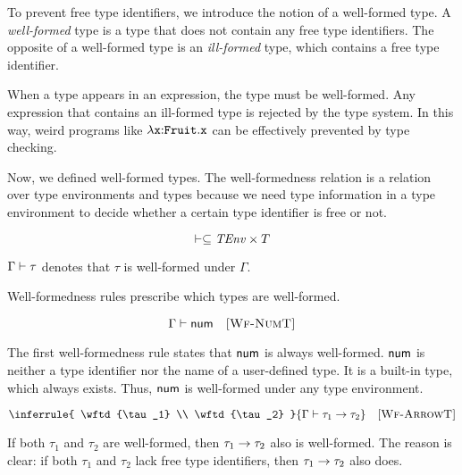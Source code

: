 To prevent free type identifiers, we introduce the notion of a well-formed type.
A \textit{well-formed} type is a type that does not contain
any free type identifiers. The opposite of a well-formed type is an
\textit{ill-formed} type, which contains a free type identifier.

When a type appears in an expression, the type must be well-formed. Any
expression that contains an ill-formed type is rejected by the type system.
In this way, weird programs like $\lambda\texttt{x}{:}\texttt{Fruit}.\texttt{x}$ can be
effectively prevented by type checking.

Now, we defined well-formed types. The well-formedness relation is a relation
over type environments and types because we need type information in a type
environment to decide whether a certain type identifier is free or not.

\[\vdash\subseteq\mbox{\emph{TEnv}}\times T\]

$\Gamma\vdash\tau$ denotes that $\tau$ is well-formed under $\Gamma$.

Well-formedness rules prescribe which types are well-formed.


\vspace{-1em}

\[
  \Gamma\vdash\textsf{num}
  \quad\textsc{[Wf-NumT]}
\]

The first well-formedness rule states that $\textsf{num}$ is always well-formed.
$\textsf{num}$ is neither a type identifier nor the name of a user-defined type. It is
a built-in type, which always exists. Thus, $\textsf{num}$ is well-formed under any
type environment.


\vspace{-1em}

\[
  \inferrule
  { \wftd{\tau_1} \\
    \wftd{\tau_2} }
  { \wftd{\tarrow{\tau_1}{\tau_2}} }
  \quad\textsc{[Wf-ArrowT]}
\]

If both $\tau_1$ and $\tau_2$ are well-formed, then
$\tau_1\rightarrow\tau_2$ also is well-formed. The reason is clear: if both
$\tau_1$ and $\tau_2$ lack free type identifiers, then $\tau_1\rightarrow\tau_2$
also does.


